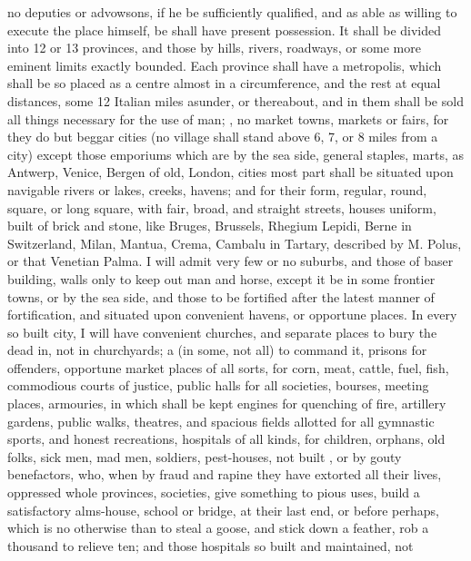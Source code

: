 no deputies or advowsons, if he be sufficiently qualified, and as able as
willing to execute the place himself, be shall have present possession. It
shall be divided into 12 or 13 provinces, and those by hills, rivers, roadways,
or some more eminent limits exactly bounded. Each province shall have a
metropolis, which shall be so placed as a centre almost in a circumference, and
the rest at equal distances, some 12 Italian miles asunder, or thereabout, and
in them shall be sold all things necessary for the use of man; , no market towns, markets or fairs, for they do but beggar cities
(no village shall stand above 6, 7, or 8 miles from a city) except those
emporiums which are by the sea side, general staples, marts, as Antwerp,
Venice, Bergen of old, London, \etc{} cities most part shall be situated upon
navigable rivers or lakes, creeks, havens; and for their form, regular, round,
square, or long square, with fair, broad, and straight
streets, houses uniform, built of brick and stone, like
Bruges, Brussels, Rhegium Lepidi, Berne in Switzerland, Milan, Mantua, Crema,
Cambalu in Tartary, described by M. Polus, or that Venetian Palma. I will admit
very few or no suburbs, and those of baser building, walls only to keep out man
and horse, except it be in some frontier towns, or by the sea side, and those
to be fortified after the latest manner of fortification,
and situated upon convenient havens, or opportune places. In every so built
city, I will have convenient churches, and separate places to bury the dead in,
not in churchyards; a  (in some, not all) to command it, prisons
for offenders, opportune market places of all sorts, for corn, meat, cattle,
fuel, fish, commodious courts of justice, public halls for all societies,
bourses, meeting places, armouries, in which shall be kept
engines for quenching of fire, artillery gardens, public walks, theatres, and
spacious fields allotted for all gymnastic sports, and honest recreations,
hospitals of all kinds, for children, orphans, old folks, sick men, mad men,
soldiers, pest-houses, \etc{} not built , or by gouty benefactors,
who, when by fraud and rapine they have extorted all their lives, oppressed
whole provinces, societies, \etc{} give something to pious uses, build a
satisfactory alms-house, school or bridge, \etc{} at their last end, or before
perhaps, which is no otherwise than to steal a goose, and stick down a feather,
rob a thousand to relieve ten; and those hospitals so built and maintained, not
